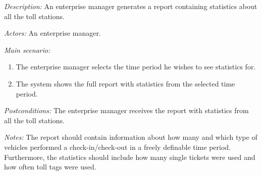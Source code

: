 \textit{Description:} An enterprise manager generates a report containing statistics about all the toll stations.

\textit{Actors:} An enterprise manager.

\textit{Main scenario:}
\begin{enumerate}
\item The enterprise manager selects the time period he wishes to see statistics for.
\item The system shows the full report with statistics from the selected time period.
\end{enumerate}

\textit{Postconditions:}
The enterprise manager receives the report with statistics from all the toll stations.

\textit{Notes:}
The report should contain information about how many and which type of vehicles performed a check-in/check-out in a freely definable time period. Furthermore, the statistics should include how many single tickets were
used and how often toll tags were used.
